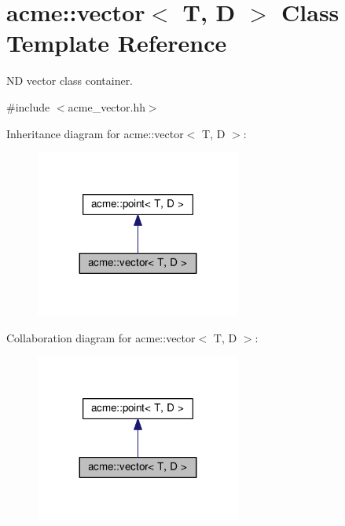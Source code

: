 \hypertarget{classacme_1_1vector}{}\section{acme\+:\+:vector$<$ T, D $>$ Class Template Reference}
\label{classacme_1_1vector}


ND vector class container.  




{\ttfamily \#include $<$acme\+\_\+vector.\+hh$>$}



Inheritance diagram for acme\+:\+:vector$<$ T, D $>$\+:\nopagebreak
\begin{figure}[H]
\begin{center}
\leavevmode
\includegraphics[width=191pt]{df/d2e/classacme_1_1vector__inherit__graph}
\end{center}
\end{figure}


Collaboration diagram for acme\+:\+:vector$<$ T, D $>$\+:\nopagebreak
\begin{figure}[H]
\begin{center}
\leavevmode
\includegraphics[width=191pt]{da/d21/classacme_1_1vector__coll__graph}
\end{center}
\end{figure}
